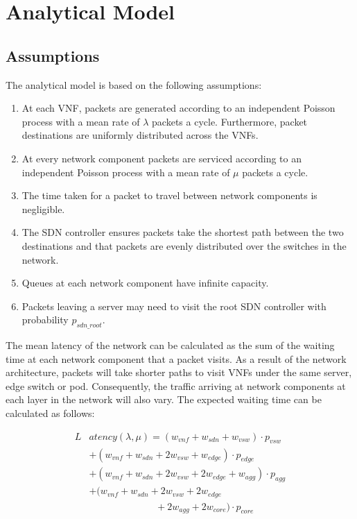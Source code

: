 
\section{Analytical Model}
\label{sec:analytical_model}

\subsection{Assumptions}
The analytical model is based on the following assumptions:

\begin{enumerate}
\item At each VNF, packets are generated according to an independent Poisson process with a mean rate of $\lambda$ packets a cycle. Furthermore, packet destinations are uniformly distributed across the VNFs.
\item At every network component packets are serviced according to an independent Poisson process with a mean rate of $\mu$ packets a cycle.
\item The time taken for a packet to travel between network components is negligible.
\item The SDN controller ensures packets take the shortest path between the two destinations and that packets are evenly distributed over the switches in the network.
\item Queues at each network component have infinite capacity.
\item Packets leaving a server may need to visit the root SDN controller with probability $p_{sdn\_root}$.
\end{enumerate}

The mean latency of the network can be calculated as the sum of the waiting time at each network component that a packet visits. As a result of the network architecture, packets will take shorter paths to visit VNFs under the same server, edge switch or pod. Consequently, the traffic arriving at network components at each layer in the network will also vary. The expected waiting time can be calculated as follows:

\begin{equation} 
\label{eq:mean_latency}
\begin{split}
L&atency(\lambda, \mu) = (w_{vnf} + w_{sdn} + w_{vsw}) \cdot p_{vsw} \\
		&+ (w_{vnf} + w_{sdn} + 2w_{vsw} + w_{edge}) \cdot p_{edge} \\
	 	&+ (w_{vnf} + w_{sdn} + 2w_{vsw} + 2w_{edge} + w_{agg}) \cdot p_{agg} \\
	 	&+ (w_{vnf} + w_{sdn} + 2w_{vsw} + 2w_{edge}  \\
		& \;\;\;\quad\qquad\quad\qquad + 2w_{agg} + 2w_{core})\cdot p_{core}
\end{split}
\end{equation}

